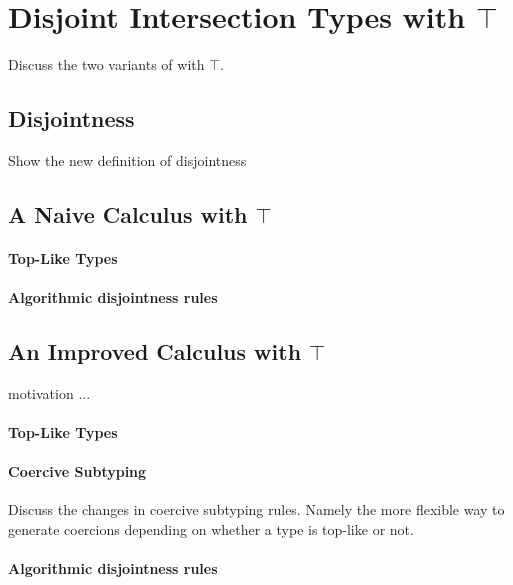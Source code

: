 \section{Disjoint Intersection Types with $\top$}

Discuss the two variants of \name with $\top$. 

\subsection{Disjointness} Show the new definition of disjointness

\subsection{A Naive Calculus with $\top$}

\paragraph{Top-Like Types}

\paragraph{Algorithmic disjointness rules}

\subsection{An Improved Calculus with $\top$}

motivation ...

\paragraph{Top-Like Types}

\paragraph{Coercive Subtyping} Discuss the changes in 
coercive subtyping rules. Namely the more flexible way to 
generate coercions depending on whether a type is top-like 
or not. 

\paragraph{Algorithmic disjointness rules}